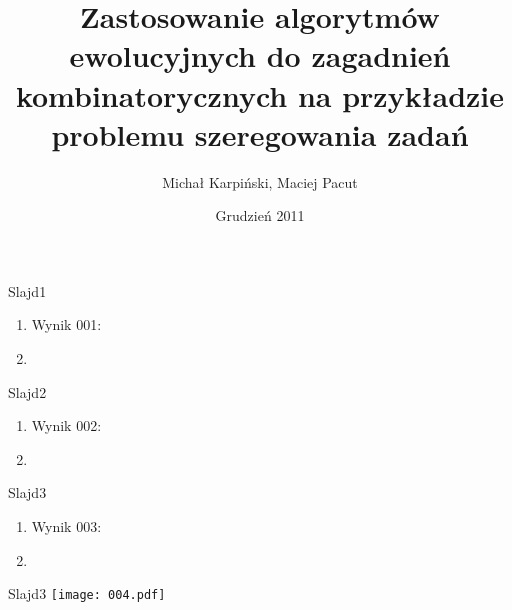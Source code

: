\documentclass{beamer}
\title{Zastosowanie algorytmów ewolucyjnych do zagadnień kombinatorycznych na przykładzie problemu szeregowania zadań}
\author{Michał Karpiński, Maciej Pacut}
\date{Grudzień 2011}
\begin{document}
\maketitle
 
\begin{frame}{Slajd1}
  \begin{enumerate}
    \item Wynik 001:
    \item 
  \end{enumerate}
\end{frame}

\begin{frame}{Slajd2}
  \begin{enumerate}
    \item Wynik 002:
    \item 
  \end{enumerate}
\end{frame}

\begin{frame}{Slajd3}
  \begin{enumerate}
    \item Wynik 003:
    \item 
  \end{enumerate}
\end{frame}

\begin{frame}{Slajd3}
  \texttt{[image: 004.pdf]}
\end{frame}
\end{document}
